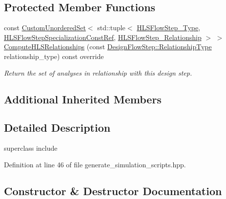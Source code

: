 \subsection*{Protected Member Functions}
\begin{DoxyCompactItemize}
\item 
const \hyperlink{classCustomUnorderedSet}{Custom\+Unordered\+Set}$<$ std\+::tuple$<$ \hyperlink{hls__step_8hpp_ada16bc22905016180e26fc7e39537f8d}{H\+L\+S\+Flow\+Step\+\_\+\+Type}, \hyperlink{hls__step_8hpp_a5fdd2edf290c196531d21d68e13f0e74}{H\+L\+S\+Flow\+Step\+Specialization\+Const\+Ref}, \hyperlink{hls__step_8hpp_a3ad360b9b11e6bf0683d5562a0ceb169}{H\+L\+S\+Flow\+Step\+\_\+\+Relationship} $>$ $>$ \hyperlink{classGenerateSimulationScripts_ac858ec8a3c5b84ecdc5e0f65be2774d6}{Compute\+H\+L\+S\+Relationships} (const \hyperlink{classDesignFlowStep_a723a3baf19ff2ceb77bc13e099d0b1b7}{Design\+Flow\+Step\+::\+Relationship\+Type} relationship\+\_\+type) const override
\begin{DoxyCompactList}\small\item\em Return the set of analyses in relationship with this design step. \end{DoxyCompactList}\end{DoxyCompactItemize}
\subsection*{Additional Inherited Members}


\subsection{Detailed Description}
superclass include 

Definition at line 46 of file generate\+\_\+simulation\+\_\+scripts.\+hpp.



\subsection{Constructor \& Destructor Documentation}
\mbox{\label{classGenerateSimulationScripts_a9e5e2b9eacb44754a15a4120a84c083f}} 
